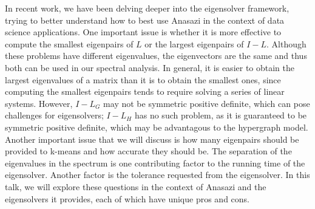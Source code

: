 \documentclass{report}
\begin{document}
In recent work, we have been delving deeper into the eigensolver
framework, trying to better understand how to best use Anasazi in the
context of data science applications. One important issue is whether it
is more effective to compute the smallest eigenpairs of $L$ or the
largest eigenpairs of $I-L$. Although these problems have different
eigenvalues, the eigenvectors are the same and thus both can be used in
our spectral analysis. In general, it is easier to obtain the largest
eigenvalues of a matrix than it is to obtain the smallest ones, since
computing the smallest eigenpairs tends to require solving a series of
linear systems. However, $I-L_G$ may not be symmetric positive definite,
which can pose challenges for eigensolvers; $I-L_H$ has no such problem,
as it is guaranteed to be symmetric positive definite, which may be
advantagous to the hypergraph model. Another important issue that we will
discuss is how many eigenpairs should be provided to k-means and how
accurate they should be. The separation of the eigenvalues in the
spectrum is one contributing factor to the running time of the
eigensolver. Another factor is the tolerance requested from the
eigensolver. In this talk, we will explore these questions in the context
of Anasazi and the eigensolvers it provides, each of which have unique
pros and cons.
\end{document}
